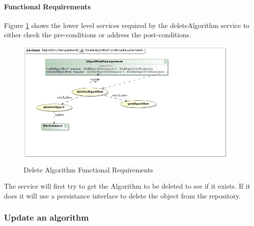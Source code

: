 \paragraph{Functional Requirements}
Figure \ref{fig:deleteAlgorithmFuncReq} shows the lower level services required
by the deleteAlgorithm service to either check the pre-conditions or address the
post-conditions.

\begin{figure}[H]
  \begin{center}
  \includegraphics[scale=0.5]{../Diagrams and Charts/Test Data/DeleteAlgorithmFunctionalRequirements.jpg}
  \caption{Delete Algorithm Functional Requirements}
  \label{fig:deleteAlgorithmFuncReq}
  \end{center}  
 \end{figure}

 The service will first try to get the Algorithm to be deleted to see if it
 exists. If it does it will use a persistance interface to delete the object
 from the repository.

\subsubsection {Update an algorithm}
